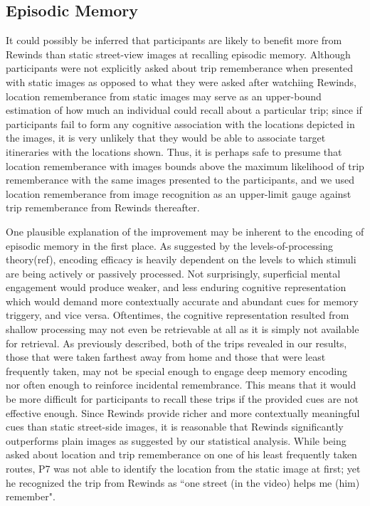 \documentclass{sigchi}
\begin{document}
\subsection{Episodic Memory}
It could possibly be inferred that participants are likely to benefit more from Rewinds than static street-view images at recalling episodic memory. Although participants were not explicitly asked about trip rememberance when presented with static images as opposed to what they were asked after watchiing Rewinds, location rememberance from static images may serve as an upper-bound estimation of how much an individual could recall about a particular trip; since if participants fail to form any cognitive association with the locations depicted in the images, it is very unlikely that they would be able to associate target itineraries with the locations shown. Thus, it is perhaps safe to presume that location rememberance with images bounds above the maximum likelihood of trip rememberance with the same images presented to the participants, and we used location rememberance from image recognition as an upper-limit gauge against trip rememberance from Rewinds thereafter.

One plausible explanation of the improvement may be inherent to the encoding of episodic memory in the first place. As suggested by the levels-of-processing theory(ref), encoding efficacy is heavily dependent on the levels to which stimuli are being actively or passively processed. Not surprisingly, superficial mental engagement would produce weaker, and less enduring cognitive representation which would demand more contextually accurate and abundant cues for memory triggery, and vice versa. Oftentimes, the cognitive representation resulted from shallow processing may not even be retrievable at all as it is simply not available for retrieval.  As previously described, both of the trips revealed in our results, those that were taken farthest away from home and those that were least frequently taken, may not be special enough to engage deep memory encoding nor often enough to reinforce incidental remembrance. This means that it would be more difficult for participants to recall these trips if the provided cues are not effective enough. Since Rewinds provide richer and more contextually meaningful cues than static street-side images, it is reasonable that Rewinds significantly outperforms plain images as suggested by our statistical analysis. While being asked about location and trip rememberance on one of his least frequently taken routes, P7 was not able to identify the location from the static image at first; yet he recognized the trip from Rewinds as ``one street (in the video) helps me (him) remember". 
\end{document}
